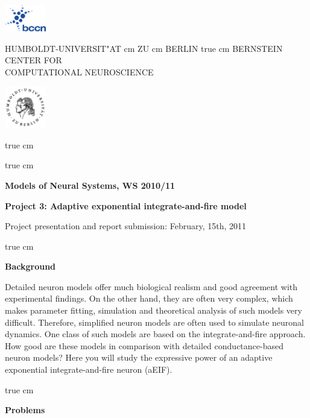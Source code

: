 \documentclass[12pt]{article}
\begin{document}
\parbox{2cm}{
\includegraphics[width=1.8cm]{../bccnlogo.pdf}
}
\parbox{11cm}{
\begin{center}
\large HUMBOLDT-UNIVERSIT"AT  cm ZU  cm BERLIN
 true cm
\mgross BERNSTEIN CENTER FOR\\ COMPUTATIONAL NEUROSCIENCE
\end{center}
}
\parbox{2cm}
{
\hfill
\includegraphics[width=1.8cm]{../hublogo.pdf}
}

 true cm



 true cm
\centerline{\bf Models of Neural Systems, WS 2010/11}
\centerline{\bf Project 3: Adaptive exponential integrate-and-fire
model} 
\centerline{Project presentation and report submission: February,
15th, 2011}

 true cm

{\bf Background}

Detailed neuron models offer much biological realism and good
agreement with experimental findings. On the other hand, they are often
very complex, which makes parameter fitting, simulation and theoretical
analysis of such models very difficult. Therefore, simplified
neuron models are often used to simulate neuronal dynamics. One class of such
models are based on the integrate-and-fire approach. How good are these
models in comparison with detailed conductance-based neuron models?
Here you will study the expressive power of an adaptive exponential
integrate-and-fire neuron (aEIF).

 true cm

{\bf Problems}
\end{document}
